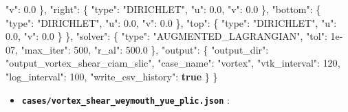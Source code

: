 \documentclass[
  10pt,
]{article}
\newenvironment{Shaded}{}{}
\newcommand{\DataTypeTok}[1]{\textcolor[rgb]{0.56,0.13,0.00}{#1}}
\newcommand{\DecValTok}[1]{\textcolor[rgb]{0.25,0.63,0.44}{#1}}
\newcommand{\FloatTok}[1]{\textcolor[rgb]{0.25,0.63,0.44}{#1}}
\newcommand{\FunctionTok}[1]{\textcolor[rgb]{0.02,0.16,0.49}{#1}}
\newcommand{\KeywordTok}[1]{\textcolor[rgb]{0.00,0.44,0.13}{\textbf{#1}}}
\newcommand{\StringTok}[1]{\textcolor[rgb]{0.25,0.44,0.63}{#1}}
\providecommand{\tightlist}{%
  \setlength{\itemsep}{0pt}\setlength{\parskip}{0pt}}
\begin{document}
\begin{Shaded}
\begin{Highlighting}[]
      \DataTypeTok{"v"}\FunctionTok{:} \FloatTok{0.0}
    \FunctionTok{\},}
    \DataTypeTok{"right"}\FunctionTok{:} \FunctionTok{\{}
      \DataTypeTok{"type"}\FunctionTok{:} \StringTok{"DIRICHLET"}\FunctionTok{,}
      \DataTypeTok{"u"}\FunctionTok{:} \FloatTok{0.0}\FunctionTok{,}
      \DataTypeTok{"v"}\FunctionTok{:} \FloatTok{0.0}
    \FunctionTok{\},}
    \DataTypeTok{"bottom"}\FunctionTok{:} \FunctionTok{\{}
      \DataTypeTok{"type"}\FunctionTok{:} \StringTok{"DIRICHLET"}\FunctionTok{,}
      \DataTypeTok{"u"}\FunctionTok{:} \FloatTok{0.0}\FunctionTok{,}
      \DataTypeTok{"v"}\FunctionTok{:} \FloatTok{0.0}
    \FunctionTok{\},}
    \DataTypeTok{"top"}\FunctionTok{:} \FunctionTok{\{}
      \DataTypeTok{"type"}\FunctionTok{:} \StringTok{"DIRICHLET"}\FunctionTok{,}
      \DataTypeTok{"u"}\FunctionTok{:} \FloatTok{0.0}\FunctionTok{,}
      \DataTypeTok{"v"}\FunctionTok{:} \FloatTok{0.0}
    \FunctionTok{\}}
  \FunctionTok{\},}
  \DataTypeTok{"solver"}\FunctionTok{:} \FunctionTok{\{}
    \DataTypeTok{"type"}\FunctionTok{:} \StringTok{"AUGMENTED\_LAGRANGIAN"}\FunctionTok{,}
    \DataTypeTok{"tol"}\FunctionTok{:} \DecValTok{1e{-}07}\FunctionTok{,}
    \DataTypeTok{"max\_iter"}\FunctionTok{:} \DecValTok{500}\FunctionTok{,}
    \DataTypeTok{"r\_al"}\FunctionTok{:} \FloatTok{500.0}
  \FunctionTok{\},}
  \DataTypeTok{"output"}\FunctionTok{:} \FunctionTok{\{}
    \DataTypeTok{"output\_dir"}\FunctionTok{:} \StringTok{"output\_vortex\_shear\_ciam\_slic"}\FunctionTok{,}
    \DataTypeTok{"case\_name"}\FunctionTok{:} \StringTok{"vortex"}\FunctionTok{,}
    \DataTypeTok{"vtk\_interval"}\FunctionTok{:} \DecValTok{120}\FunctionTok{,}
    \DataTypeTok{"log\_interval"}\FunctionTok{:} \DecValTok{100}\FunctionTok{,}
    \DataTypeTok{"write\_csv\_history"}\FunctionTok{:} \KeywordTok{true}
  \FunctionTok{\}}
\FunctionTok{\}}
\end{Highlighting}
\end{Shaded}

\begin{itemize}
\tightlist
\item
  \textbf{\texttt{cases/vortex\_shear\_weymouth\_yue\_plic.json}} :
\end{itemize}
\end{document}
